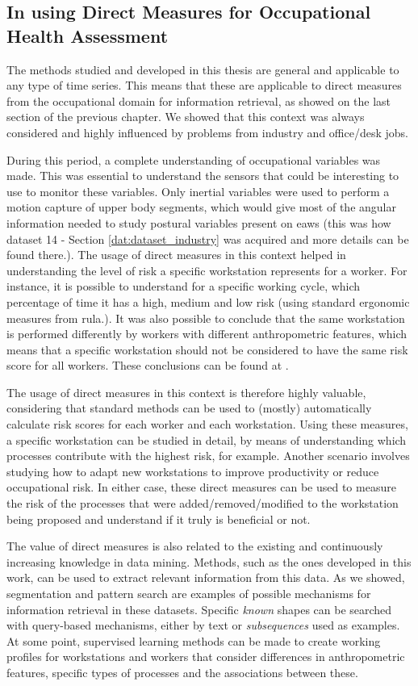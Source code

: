 \subsection{In using Direct Measures for Occupational Health Assessment}

The methods studied and developed in this thesis are general and applicable to any type of time series. This means that these are applicable to direct measures from the occupational domain for information retrieval, as showed on the last section of the previous chapter. We showed that this context was always considered and highly influenced by problems from industry and office/desk jobs. 
\par
During this period, a complete understanding of occupational variables was made. This was essential to understand the sensors that could be interesting to use to monitor these variables. Only inertial variables were used to perform a motion capture of upper body segments, which would give most of the angular information needed to study postural variables present on \gls{eaws} (this was how dataset 14 - Section \ref{dat:dataset_industry} was acquired and more details can be found there.). The usage of direct measures in this context helped in understanding the level of risk a specific workstation represents for a worker. For instance, it is possible to understand for a specific working cycle, which percentage of time it has a high, medium and low risk (using standard ergonomic measures from \gls{rula}.). It was also possible to conclude that the same workstation is performed differently by workers with different anthropometric features, which means that a specific workstation should not be considered to have the same risk score for all workers. These conclusions can be found at \cite{sara}.
\par
The usage of direct measures in this context is therefore highly valuable, considering that standard methods can be used to (mostly) automatically calculate risk scores for each worker and each workstation. Using these measures, a specific workstation can be studied in detail, by means of understanding which processes contribute with the highest risk, for example. Another scenario involves studying how to adapt new workstations to improve productivity or reduce occupational risk. In either case, these direct measures can be used to measure the risk of the processes that were added/removed/modified to the workstation being proposed and understand if it truly is beneficial or not.
\par
The value of direct measures is also related to the existing and continuously increasing knowledge in data mining. Methods, such as the ones developed in this work, can be used to extract relevant information from this data. As we showed, segmentation and pattern search are examples of possible mechanisms for information retrieval in these datasets. Specific \textit{known} shapes can be searched with query-based mechanisms, either by text or \textit{subsequences} used as examples. At some point, supervised learning methods can be made to create working profiles for workstations and workers that consider differences in anthropometric features, specific types of processes and the associations between these. 
